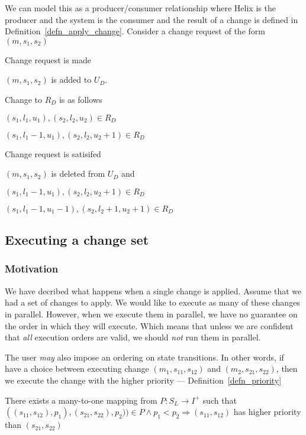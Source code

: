We can model this as a producer/consumer relationship where Helix is the
producer and the system is the consumer and the result of a change is
defined in Definition~\ref{defn_apply_change}. Consider a change request
of the form \((m, s_1, s_2)\) 
\bd
\item [PRODUCER] Change request is made
\be
\item \((m, s_1, s_2)\) is added to \(U_D\). 
\item Change to \(R_D\) is as follows
\bd
\item [PRIOR] \((s_1, l_1, u_1), (s_2, l_2, u_2) \in R_D\) 
\item [POSTERIOR] \((s_1, l_1-1, u_1), (s_2, l_2, u_2+1) \in R_D\)
\ed
\ee
\item [CONSUMER] Change request is satisifed
\be
\item \((m, s_1, s_2)\) is deleted from \(U_D\) and 
\bd
\item [PRIOR] \((s_1, l_1-1, u_1), (s_2, l_2, u_2+1) \in R_D\)
\item [POSTERIOR] \((s_1, l_1-1, u_1-1), (s_2, l_2+1, u_2+1) \in R_D\)
\ed
\ee
\ed

\subsection{Executing a change set}

\subsubsection{Motivation}
We have decribed what happens when a single change is applied. Assume
that we had a set of changes to apply. 
We would like to execute as many of these changes in parallel. However,
when we execute them in parallel, we have no guarantee on the order in
which they will execute. Which means that unless we are confident that
{\em all} execution orders are valid, we should {\em not} run them in
parallel.  

The user {\it may} also impose an ordering on state transitions. In
other words, if have a choice between executing change \((m_1, s_{11},
s_{12})\) and \((m_2, s_{21}, s_{22})\), then we execute the
change with the higher priority --- Definition~\ref{defn_priority}

\begin{definition}
\label{defn_priority}
There exists a many-to-one mapping from \(P: S_L \rightarrow I^+\) such
that \\
\(((s_{11}, s_{12}), p_1), (s_{21}, s_{22}), p_2)) \in P
\wedge p_1 < p_2 \Rightarrow (s_{11}, s_{12}) \) has higher priority
than \((s_{21}, s_{22}) \) 
\end{definition}

